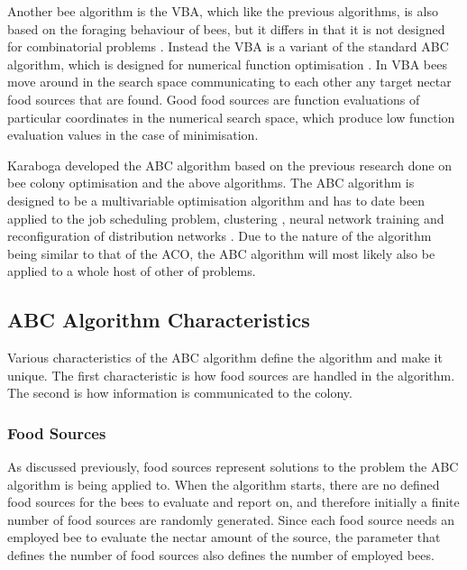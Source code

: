 Another bee algorithm is the \gls{VBA}, which like the previous algorithms, is also based on the foraging behaviour of bees, but it differs in that it is not designed for combinatorial problems \cite{ABCNumericalOptimization}. Instead the \gls{VBA} is a variant of the standard \gls{ABC} algorithm, which is designed for numerical function optimisation \cite{ABCNumericalOptimization}. In \gls{VBA} bees move around in the search space communicating to each other any target nectar food sources that are found\cite{ABCNumericalOptimization}. Good food sources are function evaluations of particular coordinates in the numerical search space, which produce low function evaluation values in the case of minimisation\cite{ABCNumericalOptimization}.

Karaboga developed the \gls{ABC} algorithm based on the previous research done on bee colony optimisation and the above algorithms. The \gls{ABC} algorithm is designed to be a multivariable optimisation algorithm and has to date been applied to the job scheduling problem, clustering \cite{HybridABCClustering}, neural network training and reconfiguration of distribution networks \cite{ABCReconfigDistro}. Due to the nature of the algorithm being similar to that of the \gls{ACO}, the \gls{ABC} algorithm will most likely also be applied to a whole host of other of problems.

\subsection{ABC Algorithm Characteristics}
Various characteristics of the \gls{ABC} algorithm define the algorithm and make it unique. The first characteristic is how food sources are handled in the algorithm. The second is how information is communicated to the colony.
\subsubsection{Food Sources}
\label{sec:foodsources}
As discussed previously, food sources represent solutions to the problem the \gls{ABC} algorithm is being applied to. When the algorithm starts, there are no defined food sources for the bees to evaluate and report on, and therefore initially a finite number of food sources are randomly generated\cite{ABCCompareStudy,ABCFusionGrid}. Since each food source needs an employed bee to evaluate the nectar amount of the source, the parameter that defines the number of food sources also defines the number of employed bees\cite{ABCCompareStudy,ABCLeafConstrained}.

